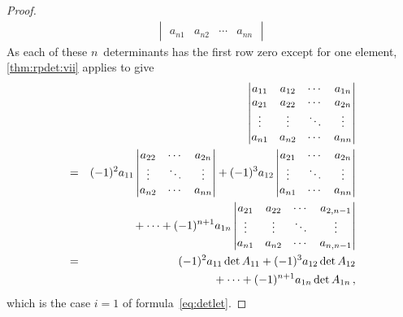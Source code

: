 \begin{proof}
\begin{eqnarray*}
\begin{vmatrix}
\\ a_{n1}&a_{n2}&\cdots&a_{nn}
\end{vmatrix}
\end{eqnarray*}
As each of these \(n\)~determinants has the first row zero except for one element,  \autoref{thm:rpdet:vii} applies to give
\begin{eqnarray*}
&&\hspace{-1em}
\begin{vmatrix} a_{11}&a_{12}&\cdots&a_{1n}
\\ a_{21}&a_{22}&\cdots&a_{2n}
\\ \vdots&\vdots&\ddots&\vdots
\\ a_{n1}&a_{n2}&\cdots&a_{nn}
\end{vmatrix}
\\&=&
(-1)^2a_{11}\begin{vmatrix} 
 a_{22}&\cdots&a_{2n}
\\ \vdots&\ddots&\vdots
\\ a_{n2}&\cdots&a_{nn}
\end{vmatrix}
+(-1)^3a_{12}\begin{vmatrix} 
 a_{21}&\cdots&a_{2n}
\\ \vdots&\ddots&\vdots
\\ a_{n1}&\cdots&a_{nn}
\end{vmatrix}
\\&&{}
+\cdots
+(-1)^{n+1}a_{1n}\begin{vmatrix}  
a_{21}&a_{22}&\cdots&a_{2,n-1}
\\ \vdots&\vdots&\ddots&\vdots
\\ a_{n1}&a_{n2}&\cdots&a_{n,n-1}
\end{vmatrix}
\\&=&(-1)^2a_{11}\det A_{11}
+(-1)^3a_{12}\det A_{12}
\\&&{}
+\cdots
+(-1)^{n+1}a_{1n}\det A_{1n}\,,
\end{eqnarray*}
which is the case \(i=1\) of formula~\eqref{eq:detlet}.


\end{proof}
